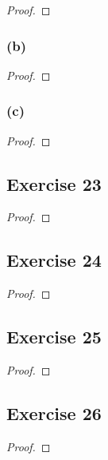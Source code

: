 \documentclass[14pt]{extarticle}
\begin{document}
\begin{proof}

\end{proof}

\subsubsection{(b)}

\begin{proof}

\end{proof}

\subsubsection{(c)}

\begin{proof}

\end{proof}

\subsection{Exercise 23}

\begin{proof}

\end{proof}

\subsection{Exercise 24}

\begin{proof}

\end{proof}

\subsection{Exercise 25}

\begin{proof}

\end{proof}

\subsection{Exercise 26}

\begin{proof}

\end{proof}
\end{document}
